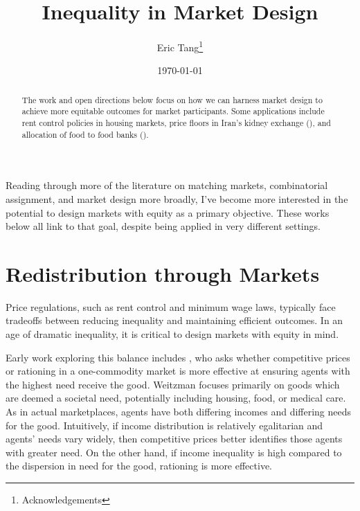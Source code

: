 \documentclass[JEL]{AEA}
\begin{document}
\title{Inequality in Market Design}
\author{Eric Tang\thanks{%
Acknowledgements}}
\date{\today}
\JEL{}
\Keywords{}

\begin{abstract}
The work and open directions below focus on how we can harness market design to achieve more equitable outcomes for market participants. Some applications include rent control policies in housing markets, price floors in Iran's kidney exchange (\cite{dworczak-2020}), and allocation of food to food banks (\cite{prendergast-2017}).
\end{abstract}

\maketitle

Reading through more of the literature on matching markets, combinatorial assignment, and market design more broadly, I've become more interested in the potential to design markets with equity as a primary objective. These works below all link to that goal, despite being applied in very different settings.

\section{Redistribution through Markets}

Price regulations, such as rent control and minimum wage laws, typically face tradeoffs between reducing inequality and maintaining efficient outcomes. In an age of dramatic inequality, it is critical to design markets with equity in mind.

Early work exploring this balance includes \cite{weitzman-1977}, who asks whether competitive prices or rationing in a one-commodity market is more effective at ensuring agents with the highest need receive the good. Weitzman focuses primarily on goods which are deemed a societal need, potentially including housing, food, or medical care. As in actual marketplaces, agents have both differing incomes and differing needs for the good. Intuitively, if income distribution is relatively egalitarian and agents' needs vary widely, then competitive prices better identifies those agents with greater need. On the other hand, if income inequality is high compared to the dispersion in need for the good, rationing is more effective.
\end{document}
